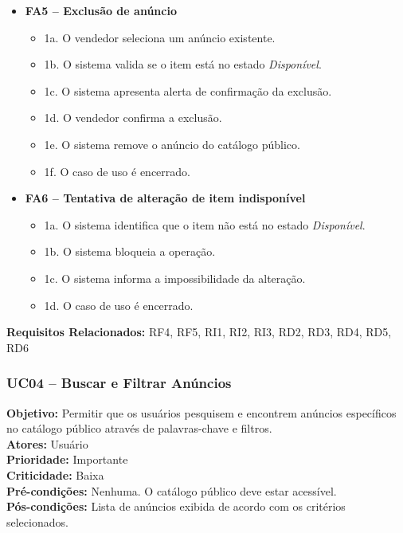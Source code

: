 \documentclass[
	article,			%
	11pt,				%
	oneside,			%
	a4paper,			%
	english,			%
	brazil,				%
	sumario=tradicional
	]{abntex2}
\begin{document}
\begin{itemize}[leftmargin=*]
    \item \textbf{FA5 – Exclusão de anúncio}
    \begin{itemize}[label={}, leftmargin=0.5cm]
        \item 1a. O vendedor seleciona um anúncio existente.
        \item 1b. O sistema valida se o item está no estado \textit{Disponível}.
        \item 1c. O sistema apresenta alerta de confirmação da exclusão.
        \item 1d. O vendedor confirma a exclusão.
        \item 1e. O sistema remove o anúncio do catálogo público.
        \item 1f. O caso de uso é encerrado.
    \end{itemize}

    \item \textbf{FA6 – Tentativa de alteração de item indisponível}
    \begin{itemize}[label={}, leftmargin=0.5cm]
        \item 1a. O sistema identifica que o item não está no estado \textit{Disponível}.
        \item 1b. O sistema bloqueia a operação.
        \item 1c. O sistema informa a impossibilidade da alteração.
        \item 1d. O caso de uso é encerrado.
    \end{itemize}
\end{itemize}

\vspace{0.5em}
\noindent\textbf{Requisitos Relacionados:} RF4, RF5, RI1, RI2, RI3, RD2, RD3, RD4, RD5, RD6


\subsubsection{UC04 – Buscar e Filtrar Anúncios}
\label{uc:08}
\noindent\textbf{Objetivo:} Permitir que os usuários pesquisem e encontrem anúncios específicos no catálogo público através de palavras-chave e filtros.\\
\textbf{Atores:} Usuário\\
\textbf{Prioridade:} Importante\\
\textbf{Criticidade:} Baixa\\
\textbf{Pré-condições:} Nenhuma. O catálogo público deve estar acessível.\\
\textbf{Pós-condições:} Lista de anúncios exibida de acordo com os critérios selecionados.
\end{document}
